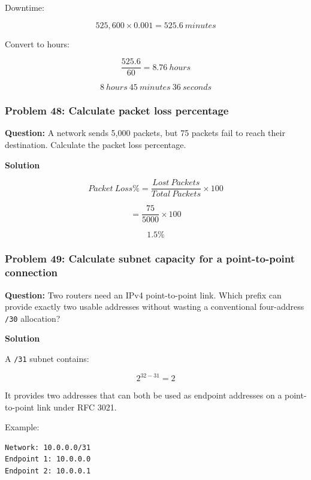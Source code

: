 Downtime:



\[
525,600\times0.001=525.6\ minutes
\]



Convert to hours:



\[
\frac{525.6}{60}=8.76\ hours
\]





\[
\boxed{8\ hours\ 45\ minutes\ 36\ seconds}
\]



\subsubsection*{Problem 48: Calculate packet loss percentage}

\textbf{Question:} A network sends 5,000 packets, but 75 packets fail to reach their destination. Calculate the packet loss percentage.

\textbf{Solution}



\[
Packet\ Loss\%= \frac{Lost\ Packets}{Total\ Packets}\times100
\]





\[
=\frac{75}{5000}\times100
\]





\[
\boxed{1.5\%}
\]



\subsubsection*{Problem 49: Calculate subnet capacity for a point-to-point connection}

\textbf{Question:} Two routers need an IPv4 point-to-point link. Which prefix can provide exactly two usable addresses without wasting a conventional four-address \texttt{/30} allocation?

\textbf{Solution}

A \texttt{/31} subnet contains:



\[
2^{32-31}=2
\]



It provides two addresses that can both be used as endpoint addresses on a point-to-point link under RFC 3021.

Example:

\begin{lstlisting}
Network: 10.0.0.0/31
Endpoint 1: 10.0.0.0
Endpoint 2: 10.0.0.1
\end{lstlisting}



